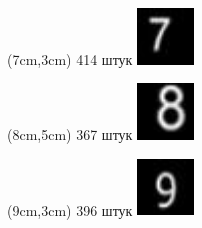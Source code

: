 \documentclass{beamer}
\begin{document}
\begin{frame}
\begin{textblock*}{1.5cm}(7cm,3cm)
\tiny 414 штук
\includegraphics[width=1.5cm]{7_00081}
\end{textblock*}

\begin{textblock*}{1.5cm}(8cm,5cm)
\tiny 367 штук
\includegraphics[width=1.5cm]{8_00068}
\end{textblock*}

\begin{textblock*}{1.5cm}(9cm,3cm)
\tiny 396 штук
\includegraphics[width=1.5cm]{9_00091}
\end{textblock*}

\end{frame}
\end{document}
